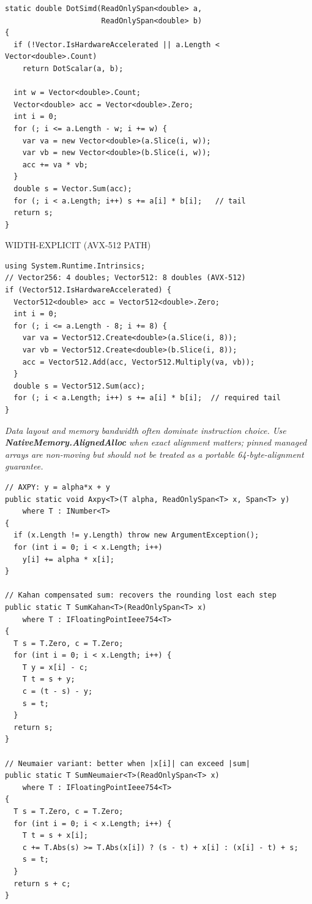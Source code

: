 \documentclass[9pt,a4paper]{extarticle}
\newenvironment{card}[3][acBlue]{%
  \begin{tcolorbox}[
    enhanced, colback=#2, colframe=bdCard,
    coltitle=black, colbacktitle=#2!70!bgHdr,
    fonttitle=\bfseries\fontsize{6.16pt}{7.48pt}\selectfont\MakeUppercase,
    title={#3},
    left=3pt, right=2pt, top=1.4pt, bottom=1.8pt,
    toptitle=1pt, bottomtitle=1pt,
    boxrule=0.4pt,
    borderline west={3pt}{0pt}{#1},
    arc=2pt, before skip=0pt, after skip=1.6mm,
    breakable, toprule at break=0pt, bottomrule at break=0pt,
  ]}{\end{tcolorbox}}
\newcommand{\sub}[1]{%
  \par\vspace{1.5pt}%
  {\fontsize{5.7pt}{7pt}\selectfont\color{gray}\MakeUppercase{#1}}\par
  \vspace{0.5pt}}
\newcommand{\code}[1]{{\ttfamily\bfseries #1}}
\newcommand{\note}[1]{\par\noindent
  \begin{minipage}{\linewidth}%
  {\fontsize{5.6pt}{6.8pt}\selectfont\itshape #1}%
  \end{minipage}\par}
\begin{document}
\begin{multicols}{2}
\begin{card}[acAmber]{bgAmber}{Portable SIMD: Vector\ensuremath{\langle}T\ensuremath{\rangle}}
\begin{lstlisting}[style=cs]
static double DotSimd(ReadOnlySpan<double> a,
                      ReadOnlySpan<double> b)
{
  if (!Vector.IsHardwareAccelerated || a.Length < Vector<double>.Count)
    return DotScalar(a, b);

  int w = Vector<double>.Count;
  Vector<double> acc = Vector<double>.Zero;
  int i = 0;
  for (; i <= a.Length - w; i += w) {
    var va = new Vector<double>(a.Slice(i, w));
    var vb = new Vector<double>(b.Slice(i, w));
    acc += va * vb;
  }
  double s = Vector.Sum(acc);
  for (; i < a.Length; i++) s += a[i] * b[i];   // tail
  return s;
}
\end{lstlisting}
\sub{Width-explicit (AVX-512 path)}
\begin{lstlisting}[style=cs]
using System.Runtime.Intrinsics;
// Vector256: 4 doubles; Vector512: 8 doubles (AVX-512)
if (Vector512.IsHardwareAccelerated) {
  Vector512<double> acc = Vector512<double>.Zero;
  int i = 0;
  for (; i <= a.Length - 8; i += 8) {
    var va = Vector512.Create<double>(a.Slice(i, 8));
    var vb = Vector512.Create<double>(b.Slice(i, 8));
    acc = Vector512.Add(acc, Vector512.Multiply(va, vb));
  }
  double s = Vector512.Sum(acc);
  for (; i < a.Length; i++) s += a[i] * b[i];  // required tail
}
\end{lstlisting}
\note{Data layout and memory bandwidth often dominate instruction choice.
Use \code{NativeMemory.AlignedAlloc} when exact alignment matters; pinned
managed arrays are non-moving but should not be treated as a portable
64-byte-alignment guarantee.}
\end{card}

\begin{card}[acGreen]{bgGreen}{Generic Math Kernels --- Numerical Quality}
\begin{lstlisting}[style=cs]
// AXPY: y = alpha*x + y
public static void Axpy<T>(T alpha, ReadOnlySpan<T> x, Span<T> y)
    where T : INumber<T>
{
  if (x.Length != y.Length) throw new ArgumentException();
  for (int i = 0; i < x.Length; i++)
    y[i] += alpha * x[i];
}

// Kahan compensated sum: recovers the rounding lost each step
public static T SumKahan<T>(ReadOnlySpan<T> x)
    where T : IFloatingPointIeee754<T>
{
  T s = T.Zero, c = T.Zero;
  for (int i = 0; i < x.Length; i++) {
    T y = x[i] - c;
    T t = s + y;
    c = (t - s) - y;
    s = t;
  }
  return s;
}

// Neumaier variant: better when |x[i]| can exceed |sum|
public static T SumNeumaier<T>(ReadOnlySpan<T> x)
    where T : IFloatingPointIeee754<T>
{
  T s = T.Zero, c = T.Zero;
  for (int i = 0; i < x.Length; i++) {
    T t = s + x[i];
    c += T.Abs(s) >= T.Abs(x[i]) ? (s - t) + x[i] : (x[i] - t) + s;
    s = t;
  }
  return s + c;
}


\end{lstlisting}
\end{card}
\end{multicols}
\end{document}
